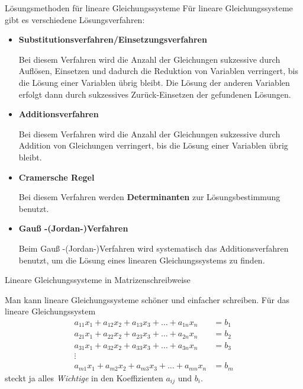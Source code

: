 \begin{frame}{Lösungsmethoden für lineare Gleichungssysteme}
	Für lineare Gleichungssysteme gibt es verschiedene Lösungsverfahren:
	\begin{itemize}
		\item \textbf{Substitutionsverfahren/Einsetzungsverfahren}
		
		Bei diesem Verfahren wird die Anzahl der Gleichungen sukzessive durch Auflösen, Einsetzen und dadurch die Reduktion von Variablen verringert, bis die Lösung einer Variablen übrig bleibt. Die Lösung der anderen Variablen erfolgt dann durch sukzessives Zurück-Einsetzen der gefundenen Lösungen.
		\item \textbf{Additionsverfahren}
		
		Bei diesem Verfahren wird die Anzahl der Gleichungen sukzessive durch Addition von Gleichungen verringert, bis die Lösung einer Variablen übrig bleibt.
		
		\item \textbf{Cramersche Regel}
		
		Bei diesem Verfahren werden \textbf{Determinanten} zur Lösungsbestimmung benutzt.
		
		\item \textbf{Gauß -(Jordan-)Verfahren}
		
		Beim Gauß -(Jordan-)Verfahren wird systematisch das Additionsverfahren benutzt, um die Lösung eines linearen Gleichungssystems zu finden.
	\end{itemize}
	
\end{frame}

\begin{frame}{Lineare Gleichungssysteme in Matrizenschreibweise}
	\begin{bemerkung}
	Man kann lineare Gleichungssysteme schöner und einfacher schreiben. Für das lineare Gleichungssystem
	\begin{align*}
	a_{11} x_{1} + a_{12} x_{2} + a_{13} x_{3} + \ldots + a_{1n} x_{n}  & =   b_{1} \\
	a_{21} x_{1} + a_{22} x_{2} + a_{23} x_{3} + \ldots + a_{2n} x_{n}  & =   b_{2} \\
	a_{31} x_{1} + a_{32} x_{2} + a_{33} x_{3} + \ldots + a_{3n} x_{n}  & =   b_{3} \\
	\vdots \qquad &  \\
	a_{m1} x_{1} + a_{m2} x_{2} + a_{m3} x_{3} + \ldots + a_{mn} x_{n}  & =   b_{m}
	\end{align*}
	steckt ja alles \emph{Wichtige} in den Koeffizienten $a_{ij}$ und $b_i$.
\end{bemerkung}
\end{frame}

